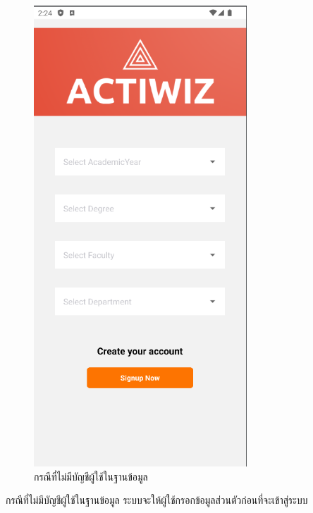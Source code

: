 \documentclass[14pt,oneside,openright,a4paper]{cpe-thai-project}
\begin{document}
\begin{figure}[!h]\centering
  \includegraphics[width=8cm]{./Pictures/RequestData.png}
  \caption{กรณีที่ไม่มีบัญชีผู้ใช้ในฐานข้อมูล}\label{fig:RequestDataUserTest}
\end{figure}
  \hspace*{1cm} กรณีที่ไม่มีบัญชีผู้ใช้ในฐานข้อมูล ระบบจะให้ผู้ใช้กรอกข้อมูลส่วนตัวก่อนที่จะเข้าสู่ระบบ

\newpage
\end{document}
